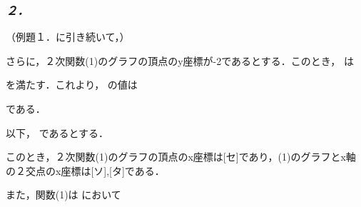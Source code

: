 \documentclass{article}
\begin{document}
\subsubsection{\textbf{\textit{２．}}}
\begin{maplegroup}
\begin{Maple Normal}{
（例題１．に引き続いて，）}\end{Maple Normal}

\begin{Maple Normal}{
さらに，２次関数(1)のグラフの頂点のy座標が-2であるとする．このとき，
は}\end{Maple Normal}

\begin{center}
\begin{Maple Normal}{
}\end{Maple Normal}
\end{center}
\begin{Maple Normal}{
を満たす．これより，
の値は}\end{Maple Normal}

\begin{center}
\begin{Maple Normal}{
}\end{Maple Normal}
\end{center}
\begin{Maple Normal}{
である．}\end{Maple Normal}

\begin{Maple Normal}{
以下，
であるとする．}\end{Maple Normal}

\begin{Maple Normal}{
このとき，２次関数(1)のグラフの頂点のx座標は[セ]であり，(1)のグラフとx軸の２交点のx座標は[ソ],[タ]である．}\end{Maple Normal}

\begin{Maple Normal}{
また，関数(1)は
において}\end{Maple Normal}


\end{maplegroup}
\end{document}
